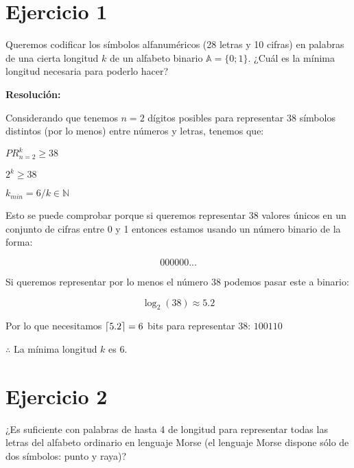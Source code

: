 \documentclass{article}
\title{
    \author{Rodrigo José Alva Sáenz}
    \date{\small \today}
}
\DeclarePairedDelimiter\ceil{\lceil}{\rceil}
\begin{document}
\maketitle %

\newpage

\section*{Ejercicio 1}

Queremos codificar los símbolos alfanuméricos (28 letras y 10 cifras) en palabras de
una cierta longitud $k$ de un alfabeto binario $\mathbb{A} = \{0; 1\}$. ¿Cuál es la mínima longitud
necesaria para poderlo hacer?

\bigskip

\textbf{Resolución:}

Considerando que tenemos $n=2$ dígitos posibles para representar 38 símbolos distintos (por lo menos) entre números y letras, tenemos que:

\begin{center}
    $PR_{n=2}^{k} \geq 38$

    \medskip

    $2^k \geq 38$

    \medskip

    $k_{min} = 6 / k \in \mathbb{N}$
\end{center}

Esto se puede comprobar porque si queremos representar 38 valores únicos en un conjunto de cifras entre 0 y 1 entonces estamos usando un número binario de la forma:

$$000000...$$

Si queremos representar por lo menos el número 38 podemos pasar este a binario:

$$\log_2(38) \approx 5.2$$

Por lo que necesitamos $\ceil{5.2} = 6$ bits para representar 38: $100110$

\bigskip

$\therefore$ La mínima longitud $k$ es 6.

\section*{Ejercicio 2}

¿Es suficiente con palabras de hasta 4 de longitud para representar todas las letras del
alfabeto ordinario en lenguaje Morse (el lenguaje Morse dispone sólo de dos símbolos:
punto y raya)?
\end{document}
